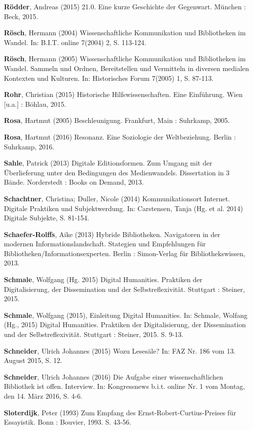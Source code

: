 \documentclass[a4paper,
fontsize=11pt,
oneside,
numbers=noperiodatend,
parskip=half-,
bibliography=totoc,
final
]{scrartcl}
\begin{document}
\textbf{Rödder}, Andreas (2015) 21.0. Eine kurze Geschichte der
Gegenwart. München : Beck, 2015.

\textbf{Rösch}, Hermann (2004) Wissenschaftliche Kommunikation und
Bibliotheken im Wandel. In: B.I.T. online 7(2004) 2, S. 113-124.

\textbf{Rösch}, Hermann (2005) Wissenschaftliche Kommunikation und
Bibliotheken im Wandel. Sammeln und Ordnen, Bereitstellen und Vermitteln
in diversen medialen Kontexten und Kulturen. In: Historisches Forum
7(2005) 1, S. 87-113.

\textbf{Rohr}, Christian (2015) Historische Hilfswissenschaften. Eine
Einführung. Wien {[}u.a.{]} : Böhlau, 2015.

\textbf{Rosa}, Hartmut (2005) Beschleunigung. Frankfurt, Main :
Suhrkamp, 2005.

\textbf{Rosa}, Hartmut (2016) Resonanz. Eine Soziologie der
Weltbeziehung. Berlin : Suhrkamp, 2016.

\textbf{Sahle}, Patrick (2013) Digitale Editionsformen. Zum Umgang mit
der Überlieferung unter den Bedingungen des Medienwandels. Dissertation
in 3 Bände. Norderstedt : Books on Demand, 2013.

\textbf{Schachtner}, Christina; Duller, Nicole (2014) Kommunikationsort
Internet. Digitale Praktiken und Subjektwerdung. In: Carstensen, Tanja
(Hg. et al. 2014) Digitale Subjekte, S. 81-154.

\textbf{Schaefer-Rolffs}, Aike (2013) Hybride Bibliotheken. Navigatoren
in der modernen Informationslandschaft. Stategien und Empfehlungen für
Bibliotheken/Informationsexperten. Berlin : Simon-Verlag für
Bibliothekswissen, 2013.

\textbf{Schmale}, Wolfgang (Hg. 2015) Digital Humanities. Praktiken der
Digitalisierung, der Dissemination und der Selbstreflexivität. Stuttgart
: Steiner, 2015.

\textbf{Schmale}, Wolfgang (2015), Einleitung Digital Humanities. In:
Schmale, Wolfang (Hg., 2015) Digital Humanities. Praktiken der
Digitalisierung, der Dissemination und der Selbstreflexivität. Stuttgart
: Steiner, 2015. S. 9-13.

\textbf{Schneider}, Ulrich Johannes (2015) Wozu Lesesäle? In: FAZ Nr.
186 vom 13. August 2015, S. 12.

\textbf{Schneider}, Ulrich Johannes (2016) Die Aufgabe einer
wissenschaftlichen Bibliothek ist offen. Interview. In: Kongressnews
b.i.t. online Nr. 1 vom Montag, den 14. März 2016, S. 4-6.

\textbf{Sloterdijk}, Peter (1993) Zum Empfang des
Ernst-Robert-Curtius-Preises für Essayistik. Bonn : Bouvier, 1993. S.
43-56.
\end{document}
